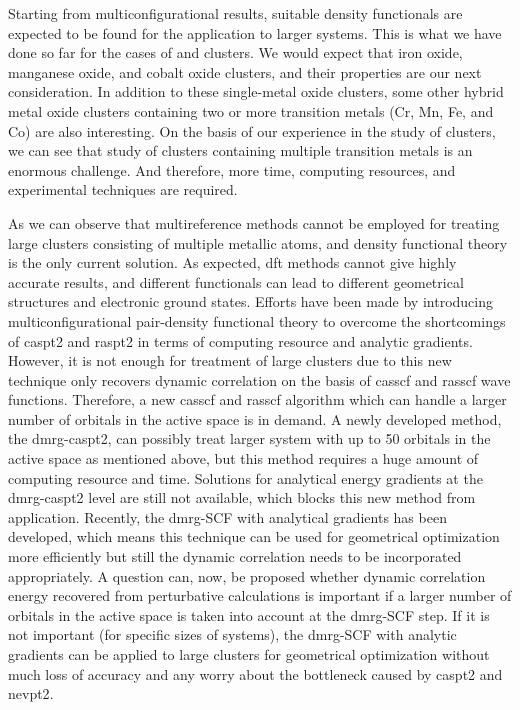 \begin{refsection}
Starting from multiconfigurational results, suitable density functionals are expected to be found for the application to larger systems. This is what we have done so far for the cases of  and  clusters. We would expect that iron oxide, manganese oxide, and cobalt oxide clusters, and their properties are our next consideration. In addition to these single-metal oxide clusters, some other hybrid metal oxide clusters containing two or more transition metals (Cr, Mn, Fe, and Co) are also interesting. On the basis of our experience in the study of  clusters, we can see that study of clusters containing multiple transition metals is an enormous challenge. And therefore, more time, computing resources, and experimental techniques are required.   



As we can observe that multireference methods cannot be employed for treating large clusters consisting of multiple metallic atoms, and density functional theory is the only current solution. As expected, \acrshort{dft} methods cannot give highly accurate results, and different functionals can lead to different geometrical structures and electronic ground states. Efforts have been made by introducing multiconfigurational pair-density functional theory \cite{con:pairDFT} to overcome the shortcomings of \acrshort{caspt2} and \acrshort{raspt2} in terms of computing resource and analytic gradients. \cite{con:pair-gra} However, it is not enough for treatment of large clusters due to this new technique only recovers dynamic correlation on the basis of \acrshort{casscf} and \acrshort{rasscf} wave functions. Therefore, a new \acrshort{casscf} and \acrshort{rasscf} algorithm which can handle a larger number of orbitals in the active space is in demand. A newly developed method, the \acrshort{dmrg}-\acrshort{caspt2}, can possibly treat larger system with up to 50 orbitals in the active space as mentioned above, but this method requires a huge amount of computing resource and time. Solutions for analytical energy gradients at the \acrshort{dmrg}-\acrshort{caspt2} level are still not available, which blocks this new method from application. Recently, the \acrshort{dmrg}-SCF with analytical gradients has been developed, \cite{con:dmrgscf-gra} which means this technique can be used for geometrical optimization more efficiently but still the dynamic correlation needs to be incorporated appropriately. A question can, now, be proposed whether dynamic correlation energy recovered from perturbative calculations is important if a larger number of orbitals in the active space is taken into account at the \acrshort{dmrg}-SCF step. If it is not important (for specific sizes of systems), the \acrshort{dmrg}-SCF with analytic gradients can be applied to large clusters for geometrical optimization without much loss of accuracy and any worry about the bottleneck caused by \acrshort{caspt2} and \acrshort{nevpt2}.
 


\end{refsection}
